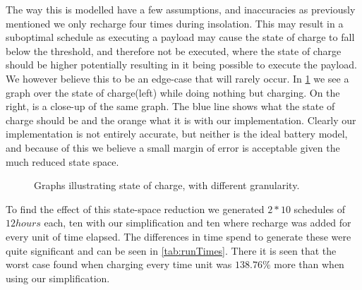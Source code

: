 The way this is modelled have a few assumptions, and inaccuracies as previously mentioned we only recharge four times during insolation. This may result in a suboptimal schedule as executing a payload may cause the state of charge to fall below the threshold, and therefore not be executed, where the state of charge should be higher potentially resulting in it being possible to execute the payload. We however believe this to be an edge-case that will rarely occur.
In \cref{fig:granularity} we see a graph over the state of charge(left) while doing nothing but charging. On the right, is a close-up of the same graph. The blue line shows what the state of charge should be and the orange what it is with our implementation. Clearly our implementation is not entirely accurate, but neither is the ideal battery model, and because of this we believe a small margin of error is acceptable given the much reduced state space.

\begin{figure}[h]%
	\centering
	\qquad
	\caption{Graphs illustrating state of charge, with different granularity.}%
	\label{fig:granularity}%
\end{figure}

To find the effect of this state-space reduction we generated $2 * 10$ schedules of $12hours$ each, ten with our simplification and ten where recharge was added for every unit of time elapsed. The differences in time spend to generate these were quite significant and can be seen in \cref{tab:runTimes}. There it is seen that the worst case found when charging every time unit was $138.76\%$ more than when using our simplification.



